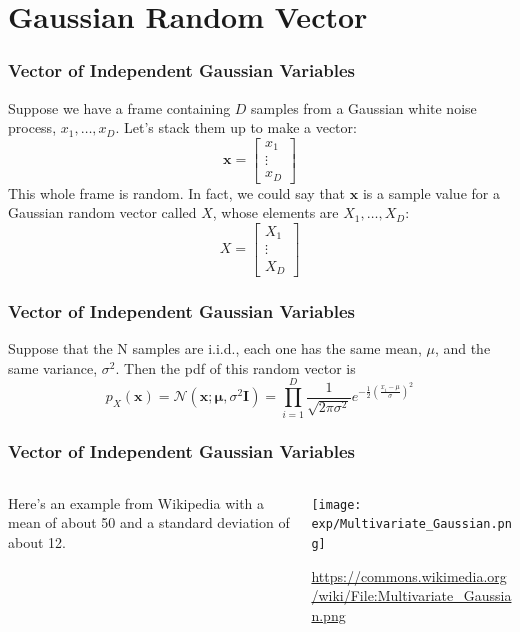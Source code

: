 \documentclass{beamer}
\begin{document}
\section[Gaussian Vector]{Gaussian Random Vector}
\setcounter{subsection}{1}

\begin{frame}
  \frametitle{Vector of Independent Gaussian Variables}
  Suppose we have a frame containing $D$ samples from a Gaussian white noise process,
  $x_1,\ldots,x_D$.  Let’s stack them up to make a vector:
  \begin{displaymath}
    \mathbf{x}=\left[\begin{array}{c}x_1\\\vdots\\x_D\end{array}\right]
  \end{displaymath}
  This whole frame is random.  In fact, we could say that $\mathbf{x}$
  is a sample value for a Gaussian random vector called $X$, whose
  elements are $X_1,\ldots,X_D$:
  \begin{displaymath}
    X=\left[\begin{array}{c}X_1\\\vdots\\X_D\end{array}\right]
  \end{displaymath}
\end{frame}

\begin{frame}
  \frametitle{Vector of Independent Gaussian Variables}

  Suppose that the N samples are i.i.d., each one has the same mean,
  $\mu$, and the same variance, $\sigma^2$.  Then the pdf of this
  random vector is
  \begin{displaymath}
    p_X(\mathbf{x}) = \mathcal{N}(\mathbf{x};\bm{\mu},\sigma^2\mathbf{I})=
    \prod_{i=1}^D\frac{1}{\sqrt{2\pi\sigma^2}}e^{-\frac{1}{2}\left(\frac{x_i-\mu}{\sigma}\right)^2}
  \end{displaymath}
\end{frame}

\begin{frame}
  \frametitle{Vector of Independent Gaussian Variables}
  
  \begin{columns}
    \begin{column}{0.5\textwidth}
      Here's an example from Wikipedia with a mean of about 50 and a
      standard deviation of about 12.
    \end{column}
    \begin{column}{0.5\textwidth}
      \centerline{\texttt{[image: exp/Multivariate\_Gaussian.png]}}

      \url{https://commons.wikimedia.org/wiki/File:Multivariate_Gaussian.png}
    \end{column}
  \end{columns}
\end{frame}
\end{document}
